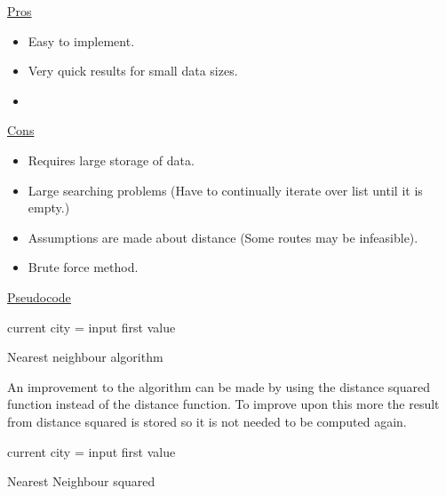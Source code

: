 \documentclass[conference,backref=page]{acmsiggraph}
\begin{document}
\underline{Pros}
\begin{itemize}
	\item Easy to implement.
	\item Very quick results for small data sizes.
	\item 
	
\end{itemize}

\underline{Cons}
\begin{itemize}
	\item Requires large storage of data. 
	\item Large searching problems (Have to continually iterate over list until it is empty.)
	\item Assumptions are made about distance (Some routes may be infeasible).
	\item Brute force method.
\end{itemize}

\underline{Pseudocode}


\begin{algorithm}	
	current city = input first value\\
\caption{Nearest neighbour algorithm}

\end{algorithm}

An improvement to the algorithm can be made by using the distance squared function instead of the distance function. To improve upon this more the result from distance squared is stored so it is not needed to be computed again.

\begin{algorithm}	
	current city = input first value\\
\caption{Nearest Neighbour squared}
\end{algorithm}
\end{document}
